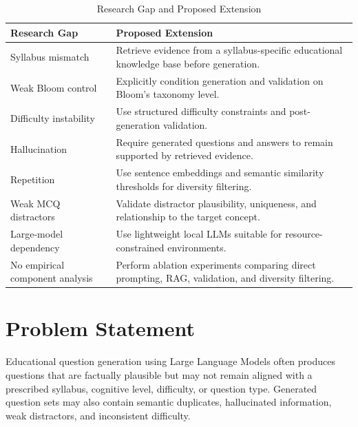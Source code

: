 \documentclass[12pt,a4paper]{report}
\begin{document}
\begin{table}[H]
\centering
\caption{Research Gap and Proposed Extension}
\label{tab:gap}
\begin{tabularx}{\textwidth}{P{0.32\textwidth} Y}
\toprule
\textbf{Research Gap} & \textbf{Proposed Extension}\\
\midrule

Syllabus mismatch &
Retrieve evidence from a syllabus-specific educational knowledge base before generation.
\\

Weak Bloom control &
Explicitly condition generation and validation on Bloom's taxonomy level.
\\

Difficulty instability &
Use structured difficulty constraints and post-generation validation.
\\

Hallucination &
Require generated questions and answers to remain supported by retrieved evidence.
\\

Repetition &
Use sentence embeddings and semantic similarity thresholds for diversity filtering.
\\

Weak MCQ distractors &
Validate distractor plausibility, uniqueness, and relationship to the target concept.
\\

Large-model dependency &
Use lightweight local LLMs suitable for resource-constrained environments.
\\

No empirical component analysis &
Perform ablation experiments comparing direct prompting, RAG, validation, and diversity filtering.
\\

\bottomrule
\end{tabularx}
\end{table}


\chapter{Problem Statement}

Educational question generation using Large Language Models often produces questions that are factually plausible but may not remain aligned with a prescribed syllabus, cognitive level, difficulty, or question type. Generated question sets may also contain semantic duplicates, hallucinated information, weak distractors, and inconsistent difficulty.
\end{document}

